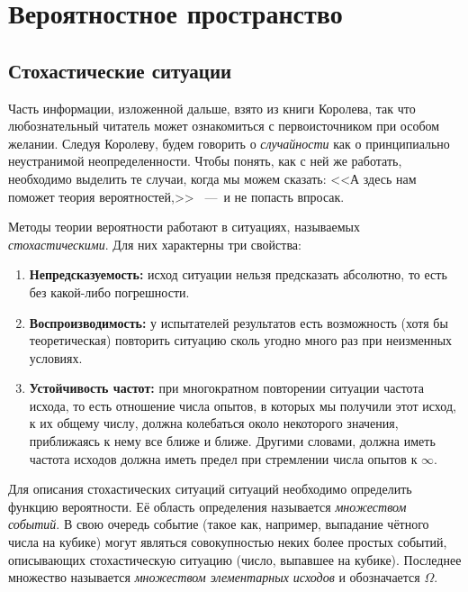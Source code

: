 \documentclass[../TV&MS.tex]{subfiles}
\begin{document}
\section{Вероятностное пространство}

\subsection{Стохастические ситуации}

\qquad Часть информации, изложенной дальше, взято из книги \cite{Korolev} Королева, 
так что любознательный читатель может ознакомиться с первоисточником при особом желании.
Следуя Королеву, будем говорить о \textit{случайности} как о принципиально
неустранимой неопределенности. Чтобы понять, как с ней же работать, необходимо
выделить те случаи, когда мы можем сказать: <<А здесь нам поможет теория вероятностей,>>
~---~и не попасть впросак.

Методы теории вероятности работают в ситуациях, называемых \textit{стохастическими}. 
Для них характерны три свойства:
\begin{enumerate}[label={\bfseries \ding{118}\quad\arabic{enumi}:},leftmargin=*]
	\item \textbf{Непредсказуемость:} исход ситуации нельзя предсказать абсолютно, то
	есть без какой-либо погрешности.
	
	\item \textbf{Воспроизводимость:} у испытателей результатов есть возможность (хотя бы 
	теоретическая) повторить ситуацию сколь угодно много раз при неизменных условиях.
	
	\item \textbf{Устойчивость частот:} при многократном повторении ситуации частота исхода,
	то есть отношение числа опытов, в которых мы получили этот исход, к их общему числу,
	должна колебаться около некоторого значения, приближаясь к нему все ближе и ближе.
	Другими словами, должна иметь частота исходов должна иметь предел при стремлении
	числа опытов к $\infty$.
\end{enumerate}

Для описания стохастических ситуаций ситуаций необходимо определить функцию вероятности. 
Её область определения называется \textit{множеством событий}. В свою очередь событие 
(такое как, например, выпадание чётного числа на кубике) могут являться совокупностью неких 
более простых событий, описывающих стохастическую ситуацию (число, выпавшее на кубике). 
Последнее множество называется \textit{множеством элементарных исходов} и обозначается $\Omega$.  
\end{document}
